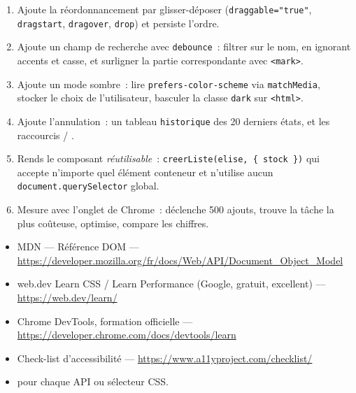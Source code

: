 \begin{exercice}
\begin{enumerate}
  \item Ajoute la r\'eordonnancement par glisser-d\'eposer (\verb|draggable="true"|,
        \verb|dragstart|, \verb|dragover|, \verb|drop|) et persiste l'ordre.
  \item Ajoute un champ de recherche avec \verb|debounce|~: filtrer sur le nom, en ignorant
        accents et casse, et surligner la partie correspondante avec \verb|<mark>|.
  \item Ajoute un mode sombre~: lire \verb|prefers-color-scheme| via
        \verb|matchMedia|, stocker le choix de l'utilisateur, basculer la classe
        \verb|dark| sur \verb|<html>|.
  \item Ajoute l'annulation~: un tableau \verb|historique| des 20 derniers \'etats, et les
        raccourcis  / .
  \item Rends le composant \emph{r\'eutilisable}~: \verb|creerListe(elise, { stock })| qui
        accepte n'importe quel \'el\'ement conteneur et n'utilise aucun \verb|document.querySelector| global.
  \item Mesure avec l'onglet  de Chrome~: d\'eclenche 500 ajouts, trouve la
        t\^ache la plus co\^uteuse, optimise, compare les chiffres.
\end{enumerate}
\end{exercice}

\begin{ressources}
\begin{itemize}
  \item MDN --- R\'ef\'erence DOM --- \url{https://developer.mozilla.org/fr/docs/Web/API/Document_Object_Model}
  \item web.dev Learn CSS / Learn Performance (Google, gratuit, excellent) --- \url{https://web.dev/learn/}
  \item Chrome DevTools, formation officielle --- \url{https://developer.chrome.com/docs/devtools/learn}
  \item Check-list d'accessibilit\'e --- \url{https://www.a11yproject.com/checklist/}
  \item {} pour chaque API ou s\'electeur CSS.
\end{itemize}
\end{ressources}

